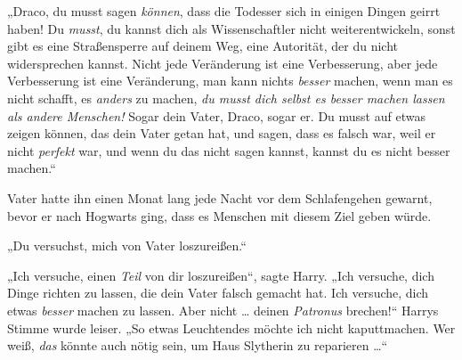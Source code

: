 „Draco, du musst sagen \emph{können}, dass die Todesser sich in einigen Dingen geirrt haben! Du \emph{musst}, du kannst dich als Wissenschaftler nicht weiterentwickeln, sonst gibt es eine Straßensperre auf deinem Weg, eine Autorität, der du nicht widersprechen kannst. Nicht jede Veränderung ist eine Verbesserung, aber jede Verbesserung ist eine Veränderung, man kann nichts \emph{besser} machen, wenn man es nicht schafft, es \emph{anders} zu machen, \emph{du musst dich selbst es besser machen lassen als andere Menschen!} Sogar dein Vater, Draco, sogar er. Du musst auf etwas zeigen können, das dein Vater getan hat, und sagen, dass es falsch war, weil er nicht \emph{perfekt} war, und wenn du das nicht sagen kannst, kannst du es nicht besser machen.“

Vater hatte ihn einen Monat lang jede Nacht vor dem Schlafengehen gewarnt, bevor er nach Hogwarts ging, dass es Menschen mit diesem Ziel geben würde.

„Du versuchst, mich von Vater loszureißen.“

„Ich versuche, einen \emph{Teil} von dir loszureißen“, sagte Harry.
„Ich versuche, dich Dinge richten zu lassen, die dein Vater falsch gemacht hat. Ich versuche, dich etwas \emph{besser} machen zu lassen. Aber nicht … deinen \emph{Patronus} brechen!“ Harrys Stimme wurde leiser.
„So etwas Leuchtendes möchte ich nicht kaputtmachen. Wer weiß, \emph{das} könnte auch nötig sein, um Haus Slytherin zu reparieren …“

